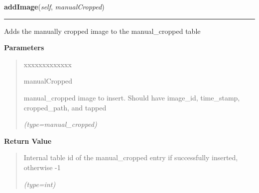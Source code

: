 \hspace{.8\funcindent}\begin{boxedminipage}{\funcwidth}

    \raggedright \textbf{addImage}(\textit{self}, \textit{manualCropped})

    \vspace{-1.5ex}

    \rule{\textwidth}{0.5\fboxrule}
\setlength{\parskip}{2ex}
    Adds the manually cropped image to the manual\_cropped table

\setlength{\parskip}{1ex}
      \textbf{Parameters}
      \vspace{-1ex}

      \begin{quote}
        \begin{Ventry}{xxxxxxxxxxxxx}

          \item[manualCropped]

          manual\_cropped image to insert. Should have image\_id, 
          time\_stamp, cropped\_path, and tapped

            {\it (type=manual\_cropped)}

        \end{Ventry}

      \end{quote}

      \textbf{Return Value}
    \vspace{-1ex}

      \begin{quote}
      Internal table id of the manual\_cropped entry if successfully 
      inserted, otherwise -1

      {\it (type=int)}

      \end{quote}

    \end{boxedminipage}

    \label{src:dao:manual_cropped_dao:ManualCroppedDAO:getImageByUID}

    \vspace{0.5ex}

